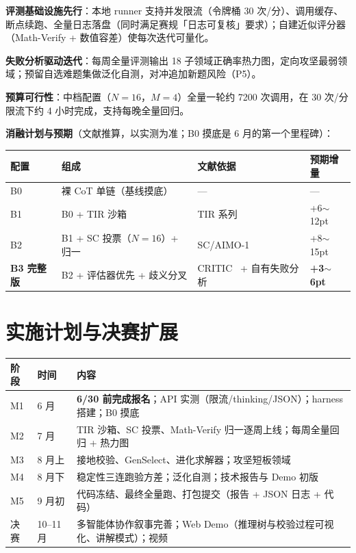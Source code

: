 \documentclass[11pt, a4paper]{ctexart}
\newcommand{\hl}[1]{\textcolor{accentred}{\textbf{#1}}}
\begin{document}
\textbf{评测基础设施先行}：本地 runner 支持并发限流（令牌桶 30 次/分）、调用缓存、断点续跑、全量日志落盘（同时满足赛规「日志可复核」要求）；自建近似评分器（Math-Verify + 数值容差）使每次迭代可量化。

\textbf{失败分析驱动迭代}：每周全量评测输出 18 子领域正确率热力图，定向攻坚最弱领域；预留自选难题集做泛化自测，对冲追加新题风险（P5）。

\textbf{预算可行性}：中档配置（$N{=}16$，$M{=}4$）全量一轮约 7200 次调用，在 30 次/分限流下约 4 小时完成，支持每晚全量回归。

\textbf{消融计划与预期}（文献推算，以实测为准；B0 摸底是 6 月的第一个里程碑）：

\begin{center}
\small
\begin{tabular}{llll}
\toprule
\textbf{配置} & \textbf{组成} & \textbf{文献依据} & \textbf{预期增量} \\
\midrule
B0 & 裸 CoT 单链（基线摸底） & --- & --- \\
B1 & B0 + TIR 沙箱 & TIR 系列~\cite{tora,pal,mathcoder} & +6$\sim$12pt \\
B2 & B1 + SC 投票（$N{=}16$）+ 归一 & SC/AIMO-1~\cite{sc,aimo1} & +8$\sim$15pt \\
\hl{B3 完整版} & B2 + 评估器优先 + 歧义分叉 & CRITIC~\cite{critic} + 自有失败分析 & \hl{+3$\sim$6pt} \\
\bottomrule
\end{tabular}
\end{center}

\section{实施计划与决赛扩展}

\begin{center}
\small
\begin{tabular}{lll}
\toprule
\textbf{阶段} & \textbf{时间} & \textbf{内容} \\
\midrule
M1 & 6 月 & \hl{6/30 前完成报名}；API 实测（限流/thinking/JSON）；harness 搭建；B0 摸底 \\
M2 & 7 月 & TIR 沙箱、SC 投票、Math-Verify 归一逐周上线；每周全量回归 + 热力图 \\
M3 & 8 月上 & 接地校验、GenSelect、进化求解器；攻坚短板领域 \\
M4 & 8 月下 & 稳定性三连跑验方差；泛化自测；技术报告与 Demo 初版 \\
M5 & 9 月初 & 代码冻结、最终全量跑、打包提交（报告 + JSON 日志 + 代码） \\
决赛 & 10--11 月 & 多智能体协作叙事完善；Web Demo（推理树与校验过程可视化、讲解模式）；视频 \\
\bottomrule
\end{tabular}
\end{center}
\end{document}
